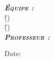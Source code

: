 \begin{titlepage}
\begin{flushleft} 
\large

\textit{\textsc{\textbf{Équipe :}}}\\
\reportauthorOne \~(\cidOne)\\ 
\reportauthorTwo \~(\cidTwo)\\ 

\vspace{0.5cm}
\textit{\textsc{\textbf{Professeur :}}}\\
\reportProfessor
\end{flushleft}

\vfill
\makeatletter
Date: \@date
\makeatother

\end{titlepage}
